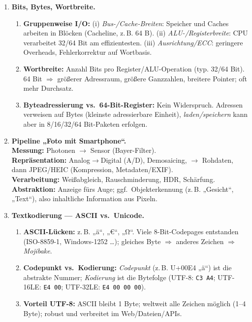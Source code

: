 \documentclass[11pt,a4paper]{scrartcl}
\begin{document}
\begin{enumerate}[leftmargin=*,label=\textbf{Aufgabe~\arabic*:}, itemsep=0.9em]
		\item \textbf{Bits, Bytes, Wortbreite.}
		\begin{enumerate}[label*=\alph*)]
			\item \textbf{Gruppenweise I/O:} (i) \emph{Bus-/Cache-Breiten}: Speicher und Caches arbeiten in Blöcken (Cacheline, z.\,B. 64 B). (ii) \emph{ALU-/Registerbreite}: CPU verarbeitet 32/64 Bit am effizientesten. (iii) \emph{Ausrichtung/ECC}: geringere Overheads, Fehlerkorrektur auf Wortbasis.
			\item \textbf{Wortbreite:} Anzahl Bits pro Register/ALU-Operation (typ. 32/64 Bit). 64 Bit \(\Rightarrow\) größerer Adressraum, größere Ganzzahlen, breitere Pointer; oft mehr Durchsatz.
			\item \textbf{Byteadressierung vs.\ 64-Bit-Register:} Kein Widerspruch. Adressen verweisen auf Bytes (kleinste adressierbare Einheit), \emph{laden/speichern} kann aber in 8/16/32/64 Bit-Paketen erfolgen.
		\end{enumerate}
		
		\item \textbf{Pipeline „Foto mit Smartphone“.}\\
		\textbf{Messung:} Photonen \(\to\) Sensor (Bayer-Filter). \\
		\textbf{Repräsentation:} Analog\(\to\)Digital (A/D), Demosaicing, \(\to\) Rohdaten, dann JPEG/HEIC (Kompression, Metadaten/EXIF). \\
		\textbf{Verarbeitung:} Weißabgleich, Rauschminderung, HDR, Schärfung. \\
		\textbf{Abstraktion:} Anzeige fürs Auge; ggf.\ Objekterkennung (z.\,B. „Gesicht“, „Text“), also inhaltliche Information aus Pixeln.
		
		\item \textbf{Textkodierung — ASCII vs.\ Unicode.}
		\begin{enumerate}[label*=\alph*)]
			\item \textbf{ASCII-Lücken:} z.\,B. „ä“, „€“, „Ω“. Viele 8-Bit-Codepages entstanden (ISO-8859-1, Windows-1252 \dots); gleiches Byte \(\Rightarrow\) anderes Zeichen \(\Rightarrow\) \emph{Mojibake}.
			\item \textbf{Codepunkt vs.\ Kodierung:} \emph{Codepunkt} (z.\,B. U+00E4 „ä“) ist die abstrakte Nummer; \emph{Kodierung} ist die Bytefolge (UTF-8: \texttt{C3 A4}; UTF-16LE: \texttt{E4 00}; UTF-32LE: \texttt{E4 00 00 00}).
			\item \textbf{Vorteil UTF-8:} ASCII bleibt 1 Byte; weltweit alle Zeichen möglich (1–4 Byte); robust und verbreitet im Web/Dateien/APIs.
		\end{enumerate}
		
	\end{enumerate}
	
\end{document}
